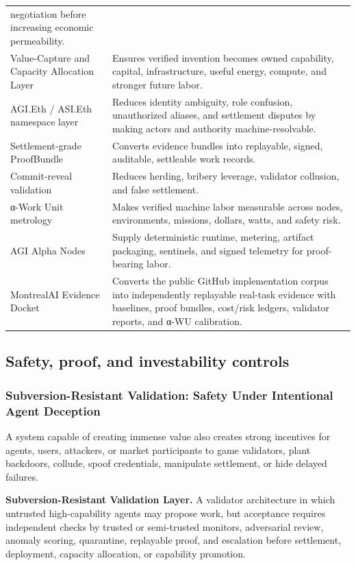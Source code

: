 \begin{longtable}[]{@{}
  >{\raggedright\arraybackslash}p{}
  >{\raggedright\arraybackslash}p{}@{}}
negotiation before increasing economic permeability. \\
Value-Capture and Capacity Allocation Layer & Ensures verified invention
becomes owned capability, capital, infrastructure, useful energy,
compute, and stronger future labor. \\
AGI.Eth / ASI.Eth namespace layer & Reduces identity ambiguity, role
confusion, unauthorized aliases, and settlement disputes by making
actors and authority machine-resolvable. \\
Settlement-grade ProofBundle & Converts evidence bundles into
replayable, signed, auditable, settleable work records. \\
Commit-reveal validation & Reduces herding, bribery leverage, validator
collusion, and false settlement. \\
α-Work Unit metrology & Makes verified machine labor measurable across
nodes, environments, missions, dollars, watts, and safety risk. \\
AGI Alpha Nodes & Supply deterministic runtime, metering, artifact
packaging, sentinels, and signed telemetry for proof-bearing labor. \\
MontrealAI Evidence Docket & Converts the public GitHub implementation
corpus into independently replayable real-task evidence with baselines,
proof bundles, cost/risk ledgers, validator reports, and α-WU
calibration. \\
\end{longtable}

\subsection{Safety, proof, and investability
controls}\label{safety-proof-and-investability-controls}

\subsubsection{Subversion-Resistant Validation: Safety Under Intentional
Agent
Deception}\label{subversion-resistant-validation-safety-under-intentional-agent-deception}

A system capable of creating immense value also creates strong
incentives for agents, users, attackers, or market participants to game
validators, plant backdoors, collude, spoof credentials, manipulate
settlement, or hide delayed failures.

\textbf{Subversion-Resistant Validation Layer.} A validator architecture
in which untrusted high-capability agents may propose work, but
acceptance requires independent checks by trusted or semi-trusted
monitors, adversarial review, anomaly scoring, quarantine, replayable
proof, and escalation before settlement, deployment, capacity
allocation, or capability promotion.

